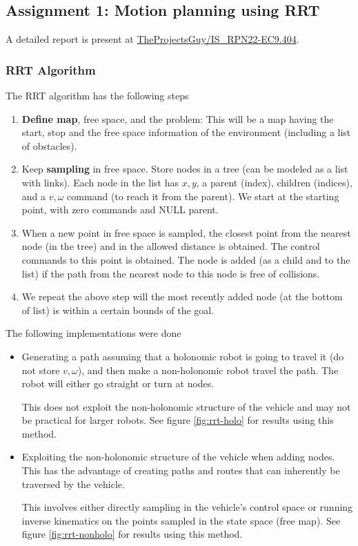 
\subsection{Assignment 1: Motion planning using RRT}

A detailed report is present at \href{https://github.com/TheProjectsGuy/IS_RPN22-EC9.404/tree/main/assignment1-over-9000}{TheProjectsGuy/IS\_RPN22-EC9.404}.

\subsubsection*{RRT Algorithm}

The RRT algorithm has the following steps

\begin{enumerate}
    \item \textbf{Define map}, free space, and the problem: This will be a map having the start, stop and the free space information of the environment (including a list of obstacles).
    \item Keep \textbf{sampling} in free space. Store nodes in a tree (can be modeled as a list with links). Each node in the list has $x, y$, a parent (index), children (indices), and a $v, \omega$ command (to reach it from the parent). We start at the starting point, with zero commands and NULL parent.
    \item When a new point in free space is sampled, the closest point from the nearest node (in the tree) and in the allowed distance is obtained. The control commands to this point is obtained. The node is added (as a child and to the list) if the path from the nearest node to this node is free of collisions.
    \item We repeat the above step will the most recently added node (at the bottom of list) is within a certain bounds of the goal.
\end{enumerate}

The following implementations were done

\begin{itemize}
    \item Generating a path assuming that a holonomic robot is going to travel it (do not store $v, \omega$), and then make a non-holonomic robot travel the path. The robot will either go straight or turn at nodes.
    
    This does not exploit the non-holonomic structure of the vehicle and may not be practical for larger robots. See figure \ref{fig:rrt-holo} for results using this method.

    \item Exploiting the non-holonomic structure of the vehicle when adding nodes. This has the advantage of creating paths and routes that can inherently be traversed by the vehicle.
    
    This involves either directly sampling in the vehicle's control space or running inverse kinematics on the points sampled in the state space (free map). See figure \ref{fig:rrt-nonholo} for results using this method.
\end{itemize}

